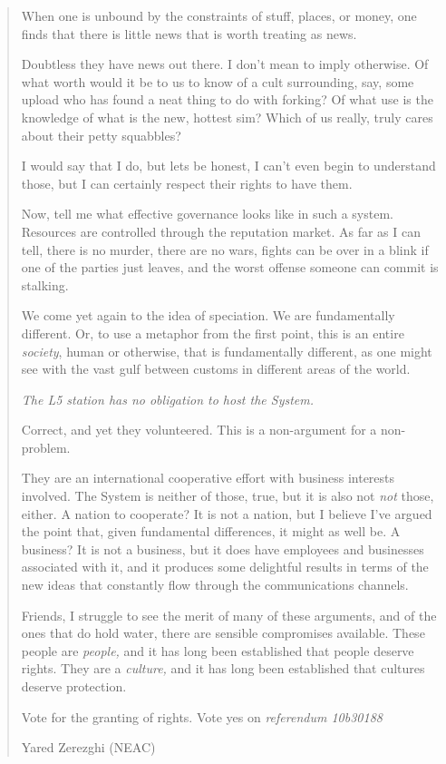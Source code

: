 \begin{quote}
When one is unbound by the constraints of stuff, places, or money, one finds that there is little news that is worth treating as news.

Doubtless they have news out there. I don't mean to imply otherwise. Of what worth would it be to us to know of a cult surrounding, say, some upload who has found a neat thing to do with forking? Of what use is the knowledge of what is the new, hottest sim? Which of us really, truly cares about their petty squabbles?

I would say that I do, but lets be honest, I can't even begin to understand those, but I can certainly respect their rights to have them.

Now, tell me what effective governance looks like in such a system. Resources are controlled through the reputation market. As far as I can tell, there is no murder, there are no wars, fights can be over in a blink if one of the parties just leaves, and the worst offense someone can commit is stalking.

We come yet again to the idea of speciation. We are fundamentally different. Or, to use a metaphor from the first point, this is an entire \emph{society}, human or otherwise, that is fundamentally different, as one might see with the vast gulf between customs in different areas of the world.

\emph{The L5 station has no obligation to host the System.}

Correct, and yet they volunteered. This is a non-argument for a non-problem.

They are an international cooperative effort with business interests involved. The System is neither of those, true, but it is also not \emph{not} those, either. A nation to cooperate? It is not a nation, but I believe I've argued the point that, given fundamental differences, it might as well be. A business? It is not a business, but it does have employees and businesses associated with it, and it produces some delightful results in terms of the new ideas that constantly flow through the communications channels.

Friends, I struggle to see the merit of many of these arguments, and of the ones that do hold water, there are sensible compromises available. These people are \emph{people,} and it has long been established that people deserve rights. They are a \emph{culture,} and it has long been established that cultures deserve protection.

Vote for the granting of rights. Vote yes on \emph{referendum 10b30188}

Yared Zerezghi (NEAC)
\end{quote}
